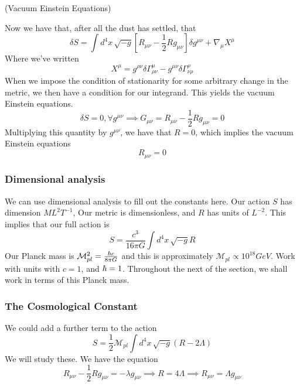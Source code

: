 \begin{thm}{(Vacuum Einstein Equations)}

Now we have that, after all the dust has settled, 
that 
\[
 \delta S = \int d ^ 4 x \, \sqrt{ - g }  \left[  
 R _{ \mu \nu }  - \frac{1}{2 } R g _{ \mu \nu } \right] \delta g ^{ \mu \nu } + \nabla _ \mu X ^ \mu  
\] Where we've written 
\[
 X ^ \mu = g ^{ \rho \nu } \delta \Gamma ^ \mu _{ \rho \nu }  - g ^{ \mu \nu } \delta \Gamma ^ \rho _{ \nu \rho }
\] 
When we impose the condition of stationarity for some 
arbitrary change in the metric, we then have a condition for our integrand. 
This yields the vacuum Einstein equations. 
\[
 \delta S = 0 , \forall g ^{ \mu \nu } \implies 
 G _{ \mu \nu } = R _{ \mu \nu } - \frac{1}{2 } R g _{ \mu \nu } =0 
\] Multiplying this quantity by $ g ^{ \mu \nu } $, we have that 
$ R = 0 $, which implies the vacuum Einstein equations 
\[
 R_{ \mu \nu } = 0 
\]
	
\end{thm}


\subsubsection{Dimensional analysis} 
We can use dimensional analysis to fill out the 
constants here. Our action $ S $ has dimension 
$ M L ^{ 2 } T ^{ - 1}  $, Our metric is dimensionless, and 
$ R $ has units of $ L ^{ - 2} $. This implies that 
our full action is 
\[
 S = \frac{ c ^ 3  }{  16 \pi G} \int d ^ 4 x \, \sqrt{ -g }  R
\]  Our Planck mass
is $ \mathcal{ M } _{ pl } ^ 2  = \frac{ \hbar c }{8 \pi G }$ and 
this is approximately $ \mathcal{ M } _{ pl } \propto 10 ^{ 18 } G eV $. 
Work with units with $ c = 1 $, and $ \hbar = 1 $. Throughout 
the next of the section, we shall 
work in terms of this Planck mass. 

\subsubsection{The Cosmological Constant} 
We could add a further term to the action 
 \[
	 S = \frac{1}{2 } \mathcal{ M  }_{ pl } \int d ^ 4 x \, \sqrt{ - g}  ( R - 2 \Lambda ) 
\] We will study these. 
We have the equation 
\[
 R_{ \mu \nu } - \frac{1}{2 } R g _{ \mu \nu } = - \lambda g _{ \mu \nu } \implies 
 R = 4 \Lambda \implies R_{ \mu \nu }  = \Lambda g _{ \mu \nu }
\]

